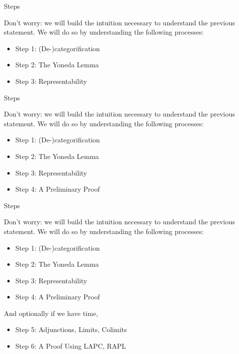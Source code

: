 \documentclass[tikz]{beamer}
\theoremstyle{definition}
\begin{document}
\begin{frame}{Steps}
    
    Don't worry: we will build the intuition necessary to understand the 
    previous statement. We will do so by understanding the following processes:
    
\begin{itemize}
    \item Step 1: (De-)categorification
    \item Step 2: The Yoneda Lemma
    \item Step 3: Representability
\end{itemize}
\end{frame}

\begin{frame}{Steps}
    
    Don't worry: we will build the intuition necessary to understand the 
    previous statement. We will do so by understanding the following processes:
    
\begin{itemize}
    \item Step 1: (De-)categorification
    \item Step 2: The Yoneda Lemma
    \item Step 3: Representability
    \item Step 4: A Preliminary Proof
\end{itemize}

\end{frame}
\begin{frame}{Steps}
    
    Don't worry: we will build the intuition necessary to understand the 
    previous statement. We will do so by understanding the following processes:
    
\begin{itemize}
    \item Step 1: (De-)categorification
    \item Step 2: The Yoneda Lemma
    \item Step 3: Representability
    \item Step 4: A Preliminary Proof
\end{itemize}
    
And optionally if we have time, 
\begin{itemize}
    \item Step 5: Adjunctions, Limits, Colimits
    \item Step 6: A Proof Using LAPC, RAPL
\end{itemize}
\end{frame}
\end{document}
